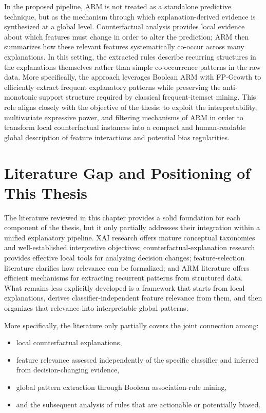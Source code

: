 In the proposed pipeline, ARM is not treated as a standalone predictive technique, but as the mechanism through which explanation-derived evidence is synthesized at a global level. Counterfactual analysis provides local evidence about which features must change in order to alter the prediction; ARM then summarizes how these relevant features systematically co-occur across many explanations. In this setting, the extracted rules describe recurring structures in the explanations themselves rather than simple co-occurrence patterns in the raw data. More specifically, the approach leverages Boolean ARM with FP-Growth to efficiently extract frequent explanatory patterns while preserving the anti-monotonic support structure required by classical frequent-itemset mining. This role aligns closely with the objective of the thesis: to exploit the interpretability, multivariate expressive power, and filtering mechanisms of ARM in order to transform local counterfactual instances into a compact and human-readable global description of feature interactions and potential bias regularities.

\section{Literature Gap and Positioning of This Thesis}
The literature reviewed in this chapter provides a solid foundation for each component of the thesis, but it only partially addresses their integration within a unified explanatory pipeline. XAI research offers mature conceptual taxonomies and well-established interpretive objectives; counterfactual-explanation research provides effective local tools for analyzing decision changes; feature-selection literature clarifies how relevance can be formalized; and ARM literature offers efficient mechanisms for extracting recurrent patterns from structured data. What remains less explicitly developed is a framework that starts from local explanations, derives classifier-independent feature relevance from them, and then organizes that relevance into interpretable global patterns.

More specifically, the literature only partially covers the joint connection among:
\begin{itemize}
  \item local counterfactual explanations,
  \item feature relevance assessed independently of the specific classifier and inferred from decision-changing evidence,
  \item global pattern extraction through Boolean association-rule mining,
  \item and the subsequent analysis of rules that are actionable or potentially biased.
\end{itemize}

